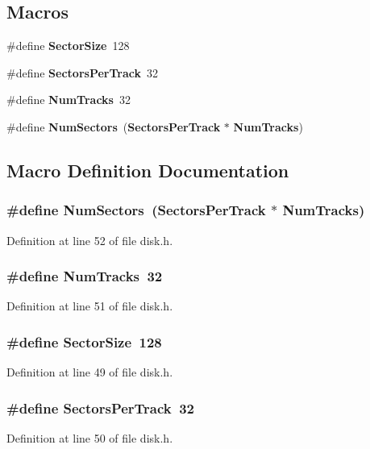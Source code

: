 \subsection*{Macros}
\begin{DoxyCompactItemize}
\item 
\#define {\bf Sector\+Size}~128
\item 
\#define {\bf Sectors\+Per\+Track}~32
\item 
\#define {\bf Num\+Tracks}~32
\item 
\#define {\bf Num\+Sectors}~({\bf Sectors\+Per\+Track} $\ast$ {\bf Num\+Tracks})
\end{DoxyCompactItemize}


\subsection{Macro Definition Documentation}
\subsubsection[{Num\+Sectors}]{\setlength{\rightskip}{0pt plus 5cm}\#define Num\+Sectors~({\bf Sectors\+Per\+Track} $\ast$ {\bf Num\+Tracks})}\label{disk_8h_a0ee898980dd88701d0d9d67dad0b7c2c}


Definition at line 52 of file disk.\+h.

\subsubsection[{Num\+Tracks}]{\setlength{\rightskip}{0pt plus 5cm}\#define Num\+Tracks~32}\label{disk_8h_a7706c1f7142bd271fd49b59559cfb01b}


Definition at line 51 of file disk.\+h.

\subsubsection[{Sector\+Size}]{\setlength{\rightskip}{0pt plus 5cm}\#define Sector\+Size~128}\label{disk_8h_ac729b32bca4535899ef2ee58b6a13d68}


Definition at line 49 of file disk.\+h.

\subsubsection[{Sectors\+Per\+Track}]{\setlength{\rightskip}{0pt plus 5cm}\#define Sectors\+Per\+Track~32}\label{disk_8h_a0d5695df8c219cb6d4753763c841927d}


Definition at line 50 of file disk.\+h.

